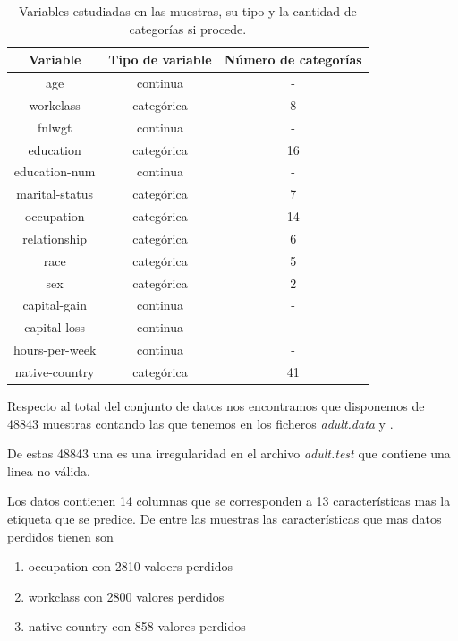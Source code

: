\documentclass[11pt]{article}
\begin{document}
\begin{table}[h!]
    \centering
    \begin{tabular}{|c|c|c|}
    \hline
    Variable & Tipo de variable & Número de categorías\\ \hline
    age & continua & - \\ \hline
    workclass & categórica & 8 \\ \hline
    fnlwgt & continua & - \\ \hline
    education & categórica & 16 \\ \hline
    education-num & continua & - \\ \hline
    marital-status & categórica & 7 \\ \hline
    occupation & categórica & 14 \\ \hline
    relationship & categórica & 6 \\ \hline
    race & categórica & 5 \\ \hline
    sex & categórica & 2 \\ \hline
    capital-gain & continua & - \\ \hline
    capital-loss & continua & - \\ \hline
    hours-per-week & continua & - \\ \hline
    native-country & categórica & 41 \\ \hline
\end{tabular}
\caption{Variables estudiadas en las muestras, su tipo y la cantidad de categorías si procede.}
\end{table}

Respecto al total del conjunto de datos nos encontramos que disponemos de
48843 muestras contando las que tenemos en los ficheros \textit{adult.data}
y . 

De estas 48843 una es una irregularidad en el archivo \textit{adult.test} que contiene 
una linea no válida.

Los datos contienen 14 columnas que se corresponden a 13 características mas 
la etiqueta que se predice. De entre las muestras las características que mas datos
perdidos tienen son 

\begin{enumerate}
    \item occupation con 2810 valoers perdidos
    \item workclass con 2800 valores perdidos 
    \item native-country con 858 valores perdidos 
\end{enumerate}
\end{document}
